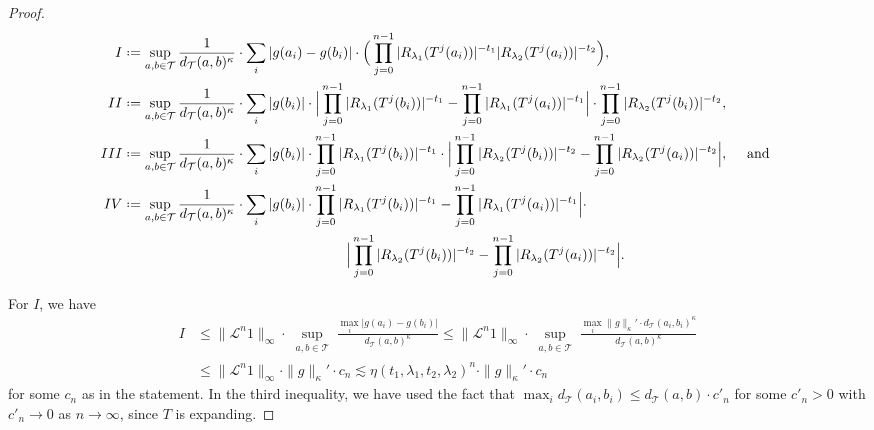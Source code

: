 \documentclass[10pt,a4paper]{amsart}
\newcommand*{\defeq}{\mathrel{\vcenter{\baselineskip0.5ex \lineskiplimit0pt
			\hbox{\scriptsize.}\hbox{\scriptsize.}}}%
	=}
\begin{document}
\begin{proof}
\begin{align*}
I & \defeq \sup_{\substack{a,b\in \mathcal T}}
\frac{1}{d_{\mathcal{T}}(a,b)^{\kappa}} \cdot \sum_{i} |g(a_i)-g(b_i)|
\cdot
\Big(
\prod_{j=0}^{n-1}
|R_{\lambda_1}(T^{j}(a_i))|^{-t_1}
|R_{\lambda_2}(T^{j}(a_i))|^{-t_2}
\Big),\\
II & \defeq
\sup_{\substack{a,b\in \mathcal T}}
\frac{1}{d_{\mathcal{T}}(a,b)^{\kappa}} \cdot \sum_{i}|g(b_i)|\cdot  \Big|
\prod_{j=0}^{n-1}
|R_{\lambda_1}(T^{j}(b_i))|^{-t_1}
-
\prod_{j=0}^{n-1}
|R_{\lambda_1}(T^{j}(a_i))|^{-t_1}
\Big|
\cdot
\prod_{j=0}^{n-1}
|R_{\lambda_2}(T^{j}(b_i))|^{-t_2},
\\
III & \defeq
\sup_{\substack{a,b\in \mathcal T}}
\frac{1}{d_{\mathcal{T}}(a,b)^{\kappa}} \cdot \sum_{i}|g(b_i)|\cdot 
\prod_{j=0}^{n-1}
|R_{\lambda_1}(T^{j}(b_i))|^{-t_1}
\cdot
\Big|
\prod_{j=0}^{n-1}
|R_{\lambda_2}(T^{j}(b_i))|^{-t_2}
-
\prod_{j=0}^{n-1}
|R_{\lambda_2}(T^{j}(a_i))|^{-t_2}
\Big|,\quad \mbox{ and }\\
IV & \defeq
\sup_{\substack{a,b\in \mathcal T}}
\frac{1}{d_{\mathcal{T}}(a,b)^{\kappa}} \cdot \sum_{i}|g(b_i)|\cdot 
\prod_{j=0}^{n-1}
|R_{\lambda_1}(T^{j}(b_i))|^{-t_1}
-
\prod_{j=0}^{n-1}
|R_{\lambda_1}(T^{j}(a_i))|^{-t_1}
\Big|
\cdot\\
& \quad \quad
\quad \quad
\quad \quad
\quad \quad
\quad \quad
\quad \quad
\quad \quad
\quad \quad  \Big|
\prod_{j=0}^{n-1}
|R_{\lambda_2}(T^{j}(b_i))|^{-t_2}
-
\prod_{j=0}^{n-1}
|R_{\lambda_2}(T^{j}(a_i))|^{-t_2}
\Big|.
\end{align*}

For $I$, we have
\begin{align*}
I &
\le \|\mathcal{L}
^n 1\|_\infty \cdot \sup_{\substack{a,b\in \mathcal T}}
\frac{\max_{i} |g(a_i)-g(b_i)|}{d_{\mathcal{T}}(a,b)^{\kappa}}
\le \|\mathcal{L}
^n 1\|_\infty \cdot \sup_{\substack{a,b\in \mathcal T}}
\frac{\max_i \|g\|_{\kappa}' \cdot d_{\mathcal{T}}(a_i,b_i)^\kappa}{d_{\mathcal{T}}(a,b)^{\kappa}}  \\
& \le
\|\mathcal{L}
^n 1\|_\infty \cdot \|g\|_{\kappa}'\cdot c_n\lesssim
\eta(t_1,\lambda_1, t_2, \lambda_2)^n
\cdot\|g\|_{\kappa}'\cdot  c_n
\end{align*}
for some $c_n$ as in the statement.
In the third inequality, we have used the fact that $\max_i d_\mathcal{T}(a_i,b_i) \le d_{\mathcal{T}}(a,b)\cdot c'_n$ for some $c'_n>0$ 
with $c'_n \to 0$ as $n \to \infty$,
since $T$ is expanding.

\medskip


\end{proof}
\end{document}
